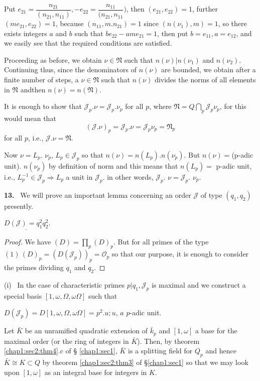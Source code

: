 Put $e_{21}=  \dfrac{n_{21}}{(n_{21}, n_{11})},- e_{22}=
\dfrac{n_{11}}{(n_{21}, n_{11}})$, then $(e_{21},
e_{22})=1$, further $(me_{21}, e_{22})=1$, because $(n_{11}, m.n_{21})
=1$ since $(n (\nu_1),m)=1$, so there exists integers $a$ and $b$ such
that $b e_{22}-a m e_{21}=1$, then put $b=e_{11}, a =e_{12}$, and we
easily see that the required conditions are satisfied.   

Proceeding as before, we obtain $\nu \in \mathfrak{N}$ such that
$n(\nu) |n(\nu_1)$ and $n(\nu_2)$. Continuing thus, since the
denominators of $n(\nu)$ are bounded, we obtain after a finite number
of steps, a $\nu \in \mathfrak{N}$ such that $n(\nu)$ divides the
norms of all elements in $\mathfrak{N}$ and\pageoriginale then $n(\nu) =n
(\mathfrak{N})$. 

It is enough to show that $\mathcal{J}_p. \nu=
\mathcal{J}_p.  \nu_p$ for all $p$, where $ \mathfrak{N}= Q
\bigcap\limits_p \mathcal{J}_p \nu_p$, for this would  mean that  
$$
(\mathcal{J}. \nu )_p = \mathcal{J}_p. \nu = \mathcal{J}_p \nu_p =
\mathfrak{N}_p 
$$
for all $p$, i.e., $\mathcal{J}. \nu= \mathfrak{N}$.

Now $\nu = L_p$. $\nu_p$, $L_p \in  \mathcal{J}_p$ so that $n(\nu)=
n(L_p).n (\nu_p)$. But $n(\nu)=$(p-adic unit). $n(\nu_p)$ by
definition of norm and this means that $n(L_p)=$ p-adic unit, i.e.,
$L^{-1}_p \in \mathcal{J}_p \Rightarrow L_p$ a unit in
$\mathcal{J}_p$. in other words, $\mathcal{J}_p$. $\nu =
\mathcal{J}_p$. $\nu_p$. 

\textbf{13.}~ We will prove an important lemma concerning an order
$\mathcal{J}$ of type $(q_1, q_2)$ presently. 
\begin{Lemma}\label{chap1:sec3:lem3} %
  $\underline{D(\mathcal{J})= q^2_1 q^2_2}$.
\end{Lemma}  

\begin{proof}
  We have $(D) = \prod\limits_p (D)_p$. But  for all primes of the
  type $(1)\,(D)_p =(D(\mathcal{J}_p))_p= \mathscr{O}_p$ so that our
  purpose, it is enough to consider the primes dividing $q_1$ and
  $q_2$.   
\end{proof}  
  
(i)~ In the case of characteristic primes $p|q_1, \mathcal{J}_p$ is
maximal and we construct a special basis $[1, \omega, \Omega, \omega
  \Omega]$ such that 

$D(\mathcal{J}_p) =D [1, \omega,
  \Omega, \omega \Omega]=p^2. u; u$, $a$ $p$-adic unit. 

Let $\bar{K}$ be an  unramified quadratic extension of $\bar{k}_p$ and
$[1, \omega]$ a base for the maximal order (or the ring of integers in
$\bar{K}$). Then, by theorem \ref{chap1:sec2:thm4}.c of \S
\ref{chap1:sec1}, $\bar{K}$ is a splitting 
field for $Q_p$ and hence $\bar{K} \cong K \subset Q$ by
theorem \ref{chap1:sec2:thm3}
of \S \ref{chap1:sec1} so that we may look upon $[1, \omega ]$ as an integral base
for integers in $K$. 

